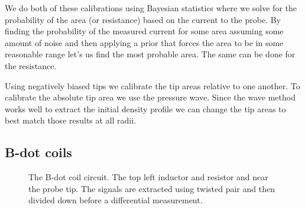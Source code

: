 
We do both of these calibrations using Bayesian statistics where we solve for the probability of the area (or resistance) based on the current to the probe. By finding the probability of the measured current for some area assuming some amount of noise and then applying a prior that forces the area to be in some reasonable range let's us find the most probable area. The same can be done for the resistance.


Using negatively biased tips we calibrate the tip areas relative to one another. To calibrate the absolute tip area we use the pressure wave. Since the wave method works well to extract the initial density profile we can change the tip areas to best match those results at all radii.

\subsection{B-dot coils}

\begin{figure}
\centering
{}%
\caption[*B-dot coil circuit]{The B-dot coil circuit. The top left inductor and resistor and near the probe tip. The signals are extracted using twisted pair and then divided down before a differential measurement.}
\label{fig:multitip_bdot_coil_circuit}
\end{figure}

